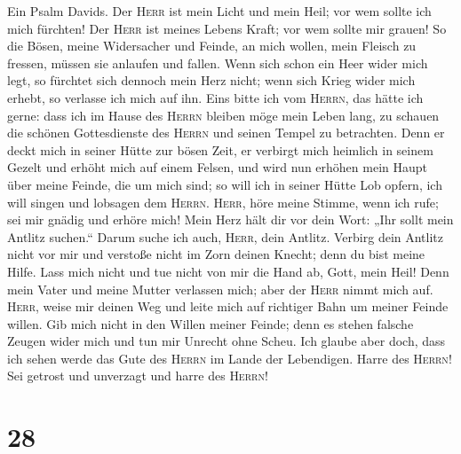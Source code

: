  Ein Psalm Davids. Der \textsc{Herr} ist mein Licht und
mein Heil; vor wem sollte ich mich fürchten! Der \textsc{Herr} ist
meines Lebens Kraft; vor wem sollte mir grauen!  So die
Bösen, meine Widersacher und Feinde, an mich wollen, mein Fleisch zu
fressen, müssen sie anlaufen und fallen.  Wenn sich schon
ein Heer wider mich legt, so fürchtet sich dennoch mein Herz nicht; wenn
sich Krieg wider mich erhebt, so verlasse ich mich auf ihn.
 Eins bitte ich vom \textsc{Herrn}, das hätte ich gerne:
dass ich im Hause des \textsc{Herrn} bleiben möge mein Leben lang, zu
schauen die schönen Gottesdienste des \textsc{Herrn} und seinen Tempel
zu betrachten.  Denn er deckt mich in seiner Hütte zur
bösen Zeit, er verbirgt mich heimlich in seinem Gezelt und erhöht mich
auf einem Felsen,  und wird nun erhöhen mein Haupt über
meine Feinde, die um mich sind; so will ich in seiner Hütte Lob opfern,
ich will singen und lobsagen dem \textsc{Herrn}. 
\textsc{Herr}, höre meine Stimme, wenn ich rufe; sei mir gnädig und
erhöre mich!  Mein Herz hält dir vor dein Wort: „Ihr sollt
mein Antlitz suchen.`` Darum suche ich auch, \textsc{Herr}, dein
Antlitz.  Verbirg dein Antlitz nicht vor mir und verstoße
nicht im Zorn deinen Knecht; denn du bist meine Hilfe. Lass mich nicht
und tue nicht von mir die Hand ab, Gott, mein Heil!  Denn
mein Vater und meine Mutter verlassen mich; aber der \textsc{Herr} nimmt
mich auf.  \textsc{Herr}, weise mir deinen Weg und leite
mich auf richtiger Bahn um meiner Feinde willen.  Gib
mich nicht in den Willen meiner Feinde; denn es stehen falsche Zeugen
wider mich und tun mir Unrecht ohne Scheu.  Ich glaube
aber doch, dass ich sehen werde das Gute des \textsc{Herrn} im Lande der
Lebendigen.  Harre des \textsc{Herrn}! Sei getrost und
unverzagt und harre des \textsc{Herrn}!

\hypertarget{section-27}{%
\section{28}\label{section-27}}

